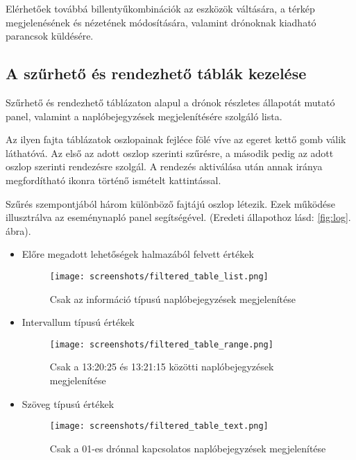 Elérhetőek továbbá billentyűkombinációk az eszközök váltására, a térkép
megjelenésének és nézetének módosítására, valamint drónoknak kiadható parancsok
küldésére.

\newpage

\subsection{A szűrhető és rendezhető táblák kezelése}
\label{filterable_sortable_table}

Szűrhető és rendezhető táblázaton alapul a drónok részletes állapotát mutató
panel, valamint a naplóbejegyzések megjelenítésére szolgáló lista.

Az ilyen fajta táblázatok oszlopainak fejléce fölé víve az egeret kettő gomb
válik láthatóvá. Az első az adott oszlop szerinti szűrésre, a második pedig az
adott oszlop szerinti rendezésre szolgál. A rendezés aktiválása után annak
iránya megfordítható ikonra történő ismételt kattintással.

Szűrés szempontjából három különböző fajtájú oszlop létezik.
Ezek működése illusztrálva az eseménynapló panel segítségével.
(Eredeti állapothoz lásd: \ref{fig:log}. ábra).

\begin{itemize}
  \item Előre megadott lehetőségek halmazából felvett értékek
  \begin{figure}[H]

    \texttt{[image: screenshots/filtered\_table\_list.png]}
    \caption{Csak az információ típusú naplóbejegyzések megjelenítése}
    \label{fig:filtered_table_list}
  \end{figure}

  \item Intervallum típusú értékek
  \begin{figure}[H]

    \texttt{[image: screenshots/filtered\_table\_range.png]}
    \caption{Csak a 13:20:25 és 13:21:15 közötti naplóbejegyzések megjelenítése}
    \label{fig:filtered_table_range}
  \end{figure}

  \item Szöveg típusú értékek
  \begin{figure}[H]

    \texttt{[image: screenshots/filtered\_table\_text.png]}
    \caption{Csak a 01-es drónnal kapcsolatos naplóbejegyzések megjelenítése}
    \label{fig:filtered_table_text}
  \end{figure}
\end{itemize}


